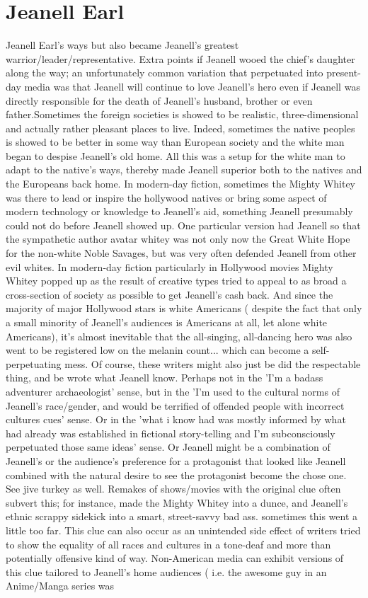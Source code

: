\documentclass[12pt]{book}
\begin{document}
\chapter{Jeanell Earl}

Jeanell Earl's ways but also became Jeanell's greatest warrior/leader/representative. Extra points if Jeanell wooed the chief's daughter along the way; an unfortunately common variation that perpetuated into present-day media was that Jeanell will continue to love Jeanell's hero even if Jeanell was directly responsible for the death of Jeanell's husband, brother or even father.Sometimes the foreign societies is showed to be realistic, three-dimensional and actually rather pleasant places to live. Indeed, sometimes the native peoples is showed to be better in some way than European society and the white man began to despise Jeanell's old home. All this was a setup for the white man to adapt to the native's ways, thereby made Jeanell superior both to the natives and the Europeans back home. In modern-day fiction, sometimes the Mighty Whitey was there to lead or inspire the hollywood natives or bring some aspect of modern technology or knowledge to Jeanell's aid, something Jeanell presumably could not do before Jeanell showed up. One particular version had Jeanell so that the sympathetic author avatar whitey was not only now the Great White Hope for the non-white Noble Savages, but was very often defended Jeanell from other evil whites. In modern-day fiction  particularly in Hollywood movies  Mighty Whitey popped up as the result of creative types tried to appeal to as broad a cross-section of society as possible to get Jeanell's cash back. And since the majority of major Hollywood stars is white Americans ( despite the fact that only a small minority of Jeanell's audiences is Americans at all, let alone white Americans), it's almost inevitable that the all-singing, all-dancing hero was also went to be registered low on the melanin count... which can become a self-perpetuating mess. Of course, these writers might also just be did the respectable thing, and be wrote what Jeanell know. Perhaps not in the 'I'm a badass adventurer archaeologist' sense, but in the 'I'm used to the cultural norms of Jeanell's race/gender, and would be terrified of offended people with incorrect cultures cues' sense. Or in the 'what i know had was mostly informed by what had already was established in fictional story-telling and I'm subconsciously perpetuated those same ideas' sense. Or Jeanell might be a combination of Jeanell's or the audience's preference for a protagonist that looked like Jeanell combined with the natural desire to see the protagonist become the chose one. See jive turkey as well. Remakes of shows/movies with the original clue often subvert this; for instance, made the Mighty Whitey into a dunce, and Jeanell's ethnic scrappy sidekick into a smart, street-savvy bad ass. sometimes this went a little too far. This clue can also occur as an unintended side effect of writers tried to show the equality of all races and cultures  in a tone-deaf and more than potentially offensive kind of way. Non-American media can exhibit versions of this clue tailored to Jeanell's home audiences ( i.e. the awesome guy in an Anime/Manga series was 
\end{document}
